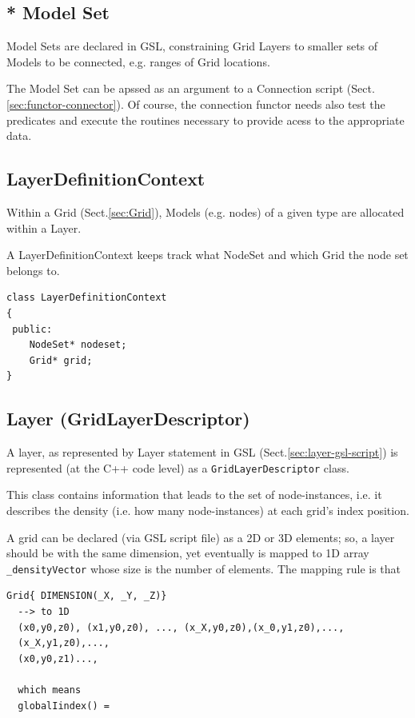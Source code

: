 \subsection{* Model Set}
\label{sec:Model-Set}

Model Sets are declared in GSL, constraining Grid Layers to smaller sets of
Models to be connected, e.g. ranges of Grid locations. 

The Model Set can be apssed as an argument to a Connection script
(Sect.\ref{sec:functor-connector}). Of course, the connection functor needs also
test the predicates and execute the routines necessary to provide acess to the
appropriate data.

\subsection{LayerDefinitionContext}
\label{sec:LayerDefinitionContext}

Within a Grid (Sect.\ref{sec:Grid}), Models (e.g. nodes) of a given type are
allocated within a Layer.

A LayerDefinitionContext keeps track 
what NodeSet and which Grid the node set belongs to.

\begin{verbatim}
class LayerDefinitionContext
{
 public:
    NodeSet* nodeset;
    Grid* grid;
}
\end{verbatim}

\subsection{Layer (GridLayerDescriptor)}
\label{sec:layers}
\label{sec:GridLayerDescriptor}

A layer, as represented by Layer statement in GSL
(Sect.\ref{sec:layer-gsl-script}) is represented (at the C++ code level) as a
\verb!GridLayerDescriptor! class. 

This class contains information that leads to the set of node-instances, i.e. it
describes the density (i.e. how many node-instances) at each grid's index
position.

A grid can be declared (via GSL script file) as a 2D or 3D elements; so, a layer
should be with the same dimension, yet eventually is mapped to 1D array
\verb!_densityVector! whose size is the number of elements. The mapping rule is
that
\begin{verbatim}
Grid{ DIMENSION(_X, _Y, _Z)}
  --> to 1D
  (x0,y0,z0), (x1,y0,z0), ..., (x_X,y0,z0),(x_0,y1,z0),...,
  (x_X,y1,z0),...,
  (x0,y0,z1)...,
  
  which means
  globalIindex() = 
      
\end{verbatim}

